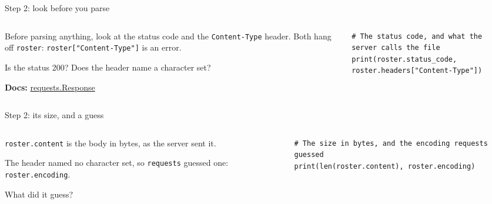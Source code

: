 \documentclass[9pt,aspectratio=169]{beamer}
\begin{document}
\begin{frame}[fragile]{Step 2: look before you parse}
    \begin{columns}[T]
        \begin{column}{0.37\textwidth}
            Before parsing anything, look at the status code and the \texttt{Content-Type} header. Both hang off \texttt{roster}: \texttt{roster["Content-Type"]} is an error.

            \medskip
            Is the status 200? Does the header name a character set?

            \medskip
            {\scriptsize\textbf{Docs:} \href{https://requests.readthedocs.io/en/stable/api/\#requests.Response}{requests.Response}\par}
        \end{column}
        \begin{column}{0.6\textwidth}
\begin{lstlisting}
# The status code, and what the server calls the file
print(roster.status_code, roster.headers["Content-Type"])
\end{lstlisting}
        \end{column}
    \end{columns}
\end{frame}

\begin{frame}[fragile]{Step 2: its size, and a guess}
    \begin{columns}[T]
        \begin{column}{0.37\textwidth}
            \texttt{roster.content} is the body in bytes, as the server sent it.

            \medskip
            The header named no character set, so \texttt{requests} guessed one: \texttt{roster.encoding}.

            \medskip
            What did it guess?
        \end{column}
        \begin{column}{0.6\textwidth}
\begin{lstlisting}
# The size in bytes, and the encoding requests guessed
print(len(roster.content), roster.encoding)
\end{lstlisting}
        \end{column}
    \end{columns}
\end{frame}
\end{document}
